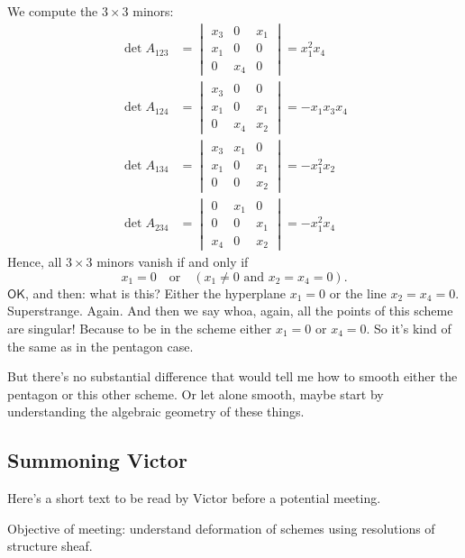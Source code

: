 We compute the $3 \times 3$ minors:
\begin{align*}
\det A_{123} &= 
\begin{vmatrix}
x_3 & 0   & x_1 \\
x_1 & 0   & 0   \\
0   & x_4 & 0
\end{vmatrix}
= x_1^2 x_4 \\
\det A_{124} &= 
\begin{vmatrix}
x_3 & 0   & 0 \\
x_1 & 0   & x_1 \\
0   & x_4 & x_2
\end{vmatrix}
= -x_1 x_3 x_4 \\
\det A_{134} &= 
\begin{vmatrix}
x_3 & x_1 & 0 \\
x_1 & 0   & x_1 \\
0   & 0   & x_2
\end{vmatrix}
= -x_1^2 x_2 \\
\det A_{234} &= 
\begin{vmatrix}
0   & x_1 & 0 \\
0   & 0   & x_1 \\
x_4 & 0   & x_2
\end{vmatrix}
= -x_1^2 x_4
\end{align*}
Hence, all $3 \times 3$ minors vanish if and only if
\[x_1 = 0 \quad \text{or} \quad (x_1 \neq 0 \text{ and } x_2 = x_4 = 0).\]
\(\mathsf{OK}\), and then: what is this? Either the hyperplane \(x_1=0\) or the line \(x_2=x_4=0\). Superstrange. Again. And then we say whoa, again, all the points of this scheme are singular! Because to be in the scheme either \(x_1=0\) or \(x_4=0\). So it's kind of the same as in the pentagon case.

But there's no substantial difference that would tell me how to smooth either the pentagon or this other scheme. Or let alone smooth, maybe start by understanding the algebraic geometry of these things.

\subsection{Summoning Victor}

Here's a short text to be read by Victor before a potential meeting.

Objective of meeting: understand deformation of schemes using resolutions of structure sheaf.

